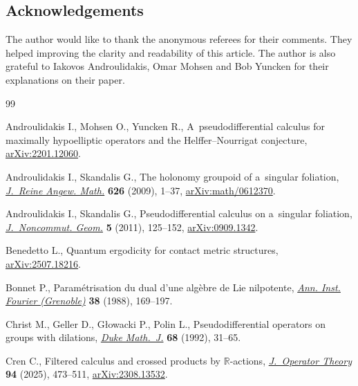 \documentclass[pdftex]{sigma}
\numberwithin{equation}{section}
\theoremstyle{definition}
\begin{document}
\subsection*{Acknowledgements}

The author would like to thank the anonymous referees for their comments. They helped improving the clarity and readability of this article. The author is also grateful to Iakovos Androulidakis, Omar Mohsen and Bob Yuncken for their explanations on their paper.

\begin{thebibliography}{99}
\footnotesize\itemsep=0pt

Androulidakis I., Mohsen O., Yuncken R., A~pseudodifferential calculus for
 maximally hypoelliptic operators and the {H}elffer--{N}ourrigat conjecture,
 \href{https://arxiv.org/abs/2201.12060}{arXiv:2201.12060}.

Androulidakis I., Skandalis G., The holonomy groupoid of a~singular foliation,
 \href{https://doi.org/10.1515/CRELLE.2009.001}{\textit{J.~Reine Angew.
 Math.}} \textbf{626} (2009), 1--37,
 \href{https://arxiv.org/abs/math/0612370}{arXiv:math/0612370}.

Androulidakis I., Skandalis G., Pseudodifferential calculus on a~singular
 foliation, \href{https://doi.org/10.4171/JNCG/72}{\textit{J.~Noncommut.
 Geom.}} \textbf{5} (2011), 125--152,
 \href{https://arxiv.org/abs/0909.1342}{arXiv:0909.1342}.

Benedetto L., Quantum ergodicity for contact metric structures,
 \href{https://arxiv.org/abs/2507.18216}{arXiv:2507.18216}.

Bonnet P., Param\'etrisation du dual d'une alg\`ebre de {L}ie nilpotente,
 \href{https://doi.org/10.5802/aif.1144}{\textit{Ann. Inst. Fourier
 (Grenoble)}} \textbf{38} (1988), 169--197.

Christ M., Geller D., G{\l}owacki P., Polin L., Pseudodifferential operators on
 groups with dilations,
 \href{https://doi.org/10.1215/S0012-7094-92-06802-5}{\textit{Duke Math.~J.}}
 \textbf{68} (1992), 31--65.

Cren C., Filtered calculus and crossed products by {$\mathbb R$}-actions,
 \href{https://doi.org/10.7900/jot}{\textit{J.~Operator Theory}} \textbf{94}
 (2025), 473--511, \href{https://arxiv.org/abs/2308.13532}{arXiv:2308.13532}.


\end{thebibliography}
\end{document}
